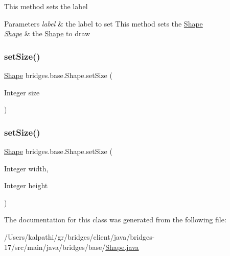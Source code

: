 This method sets the label


\begin{DoxyParams}{Parameters}
{\em label} & the label to set This method sets the \mbox{\hyperlink{classbridges_1_1base_1_1_shape}{Shape}}\\
\hline
{\em \mbox{\hyperlink{classbridges_1_1base_1_1_shape}{Shape}}} & the \mbox{\hyperlink{classbridges_1_1base_1_1_shape}{Shape}} to draw \\
\hline
\end{DoxyParams}
\mbox{\label{classbridges_1_1base_1_1_shape_a0dcc8e3f9744b6b33da311fb477b7b9b}} 
\subsubsection{\texorpdfstring{set\+Size()}{setSize()}\hspace{0.1cm}{\footnotesize\ttfamily [1/2]}}
{\footnotesize\ttfamily \mbox{\hyperlink{classbridges_1_1base_1_1_shape}{Shape}} bridges.\+base.\+Shape.\+set\+Size (\begin{DoxyParamCaption}\item[{Integer}]{size }\end{DoxyParamCaption})}

\mbox{\label{classbridges_1_1base_1_1_shape_ac3a5ab9d24a4ee87b5a5b4c7a96f0f3e}} 
\subsubsection{\texorpdfstring{set\+Size()}{setSize()}\hspace{0.1cm}{\footnotesize\ttfamily [2/2]}}
{\footnotesize\ttfamily \mbox{\hyperlink{classbridges_1_1base_1_1_shape}{Shape}} bridges.\+base.\+Shape.\+set\+Size (\begin{DoxyParamCaption}\item[{Integer}]{width,  }\item[{Integer}]{height }\end{DoxyParamCaption})}



The documentation for this class was generated from the following file\+:\begin{DoxyCompactItemize}
\item 
/\+Users/kalpathi/gr/bridges/client/java/bridges-\/17/src/main/java/bridges/base/\mbox{\hyperlink{_shape_8java}{Shape.\+java}}\end{DoxyCompactItemize}
